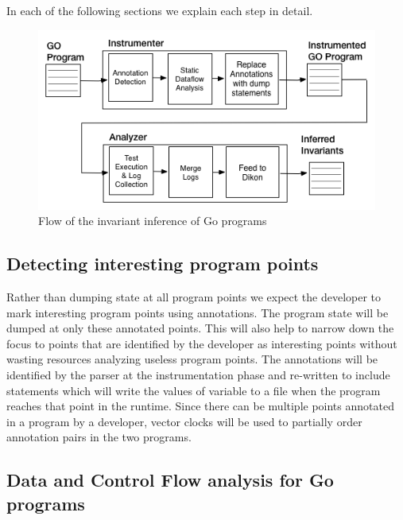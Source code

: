 In each of the following sections we explain each step in detail.
\begin{figure}
  \includegraphics[width=\columnwidth]{go_flow.png}
  \caption{Flow of the invariant inference of Go programs}
  \label{fig:go_flow}
\end{figure}



\subsection{Detecting interesting program points}

Rather than dumping state at all program points we expect the
developer to mark interesting program points using annotations. The
program state will be dumped at only these annotated points. This will
also help to narrow down the focus to points that are identified by
the developer as interesting points without wasting resources
analyzing useless program points. The annotations will be identified
by the parser at the instrumentation phase and re-written to include
statements which will write the values of variable to a file when the
program reaches that point in the runtime. Since there can be multiple points annotated in a program by a
developer, vector clocks will be used to partially order annotation
pairs in the two programs.%

\subsection{Data and Control Flow analysis for Go programs}

